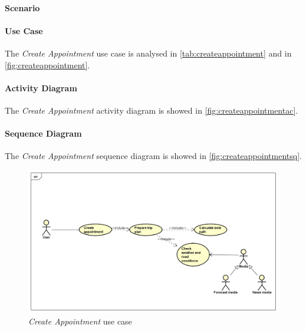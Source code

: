 \paragraph*{Scenario\\}

\paragraph*{Use Case\\}
The \emph{Create Appointment} use case is analysed in \autoref{tab:createappointment} and in \autoref{fig:createappointment}.

\paragraph*{Activity Diagram\\}
The \emph{Create Appointment} activity diagram is showed in \autoref{fig:createappointmentac}.

\paragraph*{Sequence Diagram\\}
The \emph{Create Appointment} sequence diagram is showed in \autoref{fig:createappointmentsq}.

\begin{figure}[h]
	\includegraphics[width=\textwidth, keepaspectratio=true]{Img/CreateAppointmentUC}
	\caption{\emph{Create Appointment} use case}
	\label{fig:createappointment}
\end{figure}

